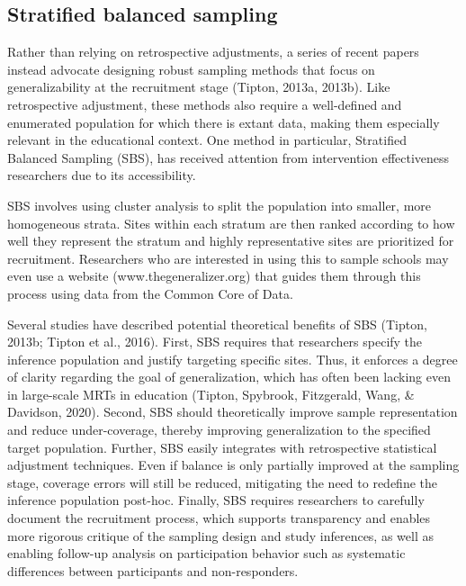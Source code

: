 \documentclass[
  english,
  man,floatsintext]{apa6}
\begin{document}
\hypertarget{stratified-balanced-sampling}{%
\subsection{Stratified balanced sampling}\label{stratified-balanced-sampling}}

Rather than relying on retrospective adjustments, a series of recent papers instead advocate designing robust sampling methods that focus on generalizability at the recruitment stage (Tipton, 2013a, 2013b). Like retrospective adjustment, these methods also require a well-defined and enumerated population for which there is extant data, making them especially relevant in the educational context.
One method in particular, Stratified Balanced Sampling (SBS), has received attention from intervention effectiveness researchers due to its accessibility.

SBS involves using cluster analysis to split the population into smaller, more homogeneous strata. Sites within each stratum are then ranked according to how well they represent the stratum and highly representative sites are prioritized for recruitment.
Researchers who are interested in using this to sample schools may even use a website (www.thegeneralizer.org) that guides them through this process using data from the Common Core of Data.

Several studies have described potential theoretical benefits of SBS (Tipton, 2013b; Tipton et al., 2016). First, SBS requires that researchers specify the inference population and justify targeting specific sites. Thus, it enforces a degree of clarity regarding the goal of generalization, which has often been lacking even in large-scale MRTs in education (Tipton, Spybrook, Fitzgerald, Wang, \& Davidson, 2020). Second, SBS should theoretically improve sample representation and reduce under-coverage, thereby improving generalization to the specified target population. Further, SBS easily integrates with retrospective statistical adjustment techniques. Even if balance is only partially improved at the sampling stage, coverage errors will still be reduced, mitigating the need to redefine the inference population post-hoc.
Finally, SBS requires researchers to carefully document the recruitment process, which supports transparency and enables more rigorous critique of the sampling design and study inferences, as well as enabling follow-up analysis on participation behavior such as systematic differences between participants and non-responders.
\end{document}
